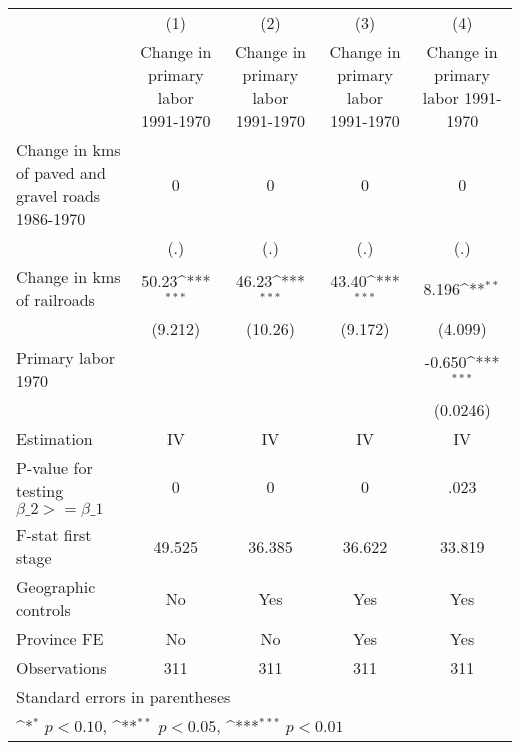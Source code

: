 {
\def\sym#1{\ifmmode^{#1}\else\(^{#1}\)\fi}
\begin{tabular}{l*{4}{c}}
\hline\hline
                    &\multicolumn{1}{c}{(1)}&\multicolumn{1}{c}{(2)}&\multicolumn{1}{c}{(3)}&\multicolumn{1}{c}{(4)}\\
                    &\multicolumn{1}{c}{Change in primary labor 1991-1970}&\multicolumn{1}{c}{Change in primary labor 1991-1970}&\multicolumn{1}{c}{Change in primary labor 1991-1970}&\multicolumn{1}{c}{Change in primary labor 1991-1970}\\
\hline
Change in kms of paved and gravel roads 1986-1970&           0         &           0         &           0         &           0         \\
                    &         (.)         &         (.)         &         (.)         &         (.)         \\
[1em]
Change in kms of railroads&       50.23\sym{***}&       46.23\sym{***}&       43.40\sym{***}&       8.196\sym{**} \\
                    &     (9.212)         &     (10.26)         &     (9.172)         &     (4.099)         \\
[1em]
Primary labor 1970  &                     &                     &                     &      -0.650\sym{***}\\
                    &                     &                     &                     &    (0.0246)         \\
\hline
Estimation          &          IV         &          IV         &          IV         &          IV         \\
P-value for testing $\beta\_2 >= \beta\_1$&           0         &           0         &           0         &        .023         \\
F-stat first stage  &      49.525         &      36.385         &      36.622         &      33.819         \\
Geographic controls &          No         &         Yes         &         Yes         &         Yes         \\
Province FE         &          No         &          No         &         Yes         &         Yes         \\
Observations        &         311         &         311         &         311         &         311         \\
\hline\hline
\multicolumn{5}{l}{\footnotesize Standard errors in parentheses}\\
\multicolumn{5}{l}{\footnotesize \sym{*} \(p<0.10\), \sym{**} \(p<0.05\), \sym{***} \(p<0.01\)}\\
\end{tabular}
}
